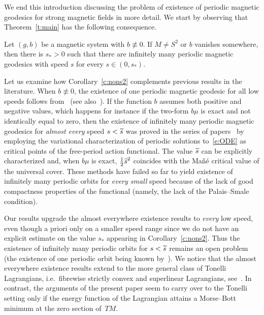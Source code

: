 \documentclass[AHL,Unicode,longabstracts,published]{cedram}
\let\oldtilde\tilde
\renewcommand*{\tilde}[1]{\mathchoice{\widetilde{#1}}{\widetilde{#1}}{\oldtilde{#1}}{\oldtilde{#1}}}
\begin{document}
We end this introduction discussing the problem of existence of periodic magnetic geodesics for strong magnetic fields in more detail. We start by observing that Theorem~\ref{t:main} has the following consequence.

\begin{coro}\label{c:nons2}
Let $(g,b)$ be a magnetic system with $b\not\equiv 0$. If $M\neq S^2$ or $b$ vanishes somewhere, then there is $s_*>0$ such that there are infinitely many periodic magnetic geodesics with speed $s$ for every $s\in (0,s_*)$.
\end{coro}

Let us examine how Corollary~\ref{c:nons2} complements previous results in the literature. When $b\not\equiv 0$, the existence of one periodic magnetic geodesic for all low speeds follows from~\cite{Ginzburg:1987lq} (see also~\cite{AB21}). If the function $b$ assumes both positive and negative values, which happens for instance if the two-form $b\mu$ is exact and not identically equal to zero, then the existence of infinitely many periodic magnetic geodesics for \emph{almost every} speed $s<\tilde s$ was proved in the series of papers~\cite{Abbondandolo:2017,Asselle:2015ij,Asselle:2015hc,Abbondandolo:2014rb,Abbondandolo:2015lt} by employing the variational characterization of periodic solutions to~\eqref{e:ODE} as critical points of the free-period action functional. The value $\tilde s$ can be explicitly characterized and, when $b\mu$ is exact, $\tfrac12{\tilde s}^2$ coincides with the Mañé critical value of the universal cover. These methods have failed so far to yield existence of infinitely many periodic orbits for \emph{every small} speed because of the lack of good compactness properties of the functional (namely, the lack of the Palais--Smale condition).

Our results upgrade the almost everywhere existence results to \emph{every} low speed, even though a priori only on a smaller speed range since we do not have an explicit estimate on the value $s_*$ appearing in Corollary~\ref{c:nons2}. Thus the existence of infinitely many periodic orbits for $s<\tilde s$ remains an open problem (the existence of one periodic orbit being known by~\cite{Contreras:2004lv,Taimanov:1992fs}). We notice that the almost everywhere existence results extend to the more general class of Tonelli Lagrangians, i.e.~fibrewise strictly convex and superlinear Lagrangians, see~\cite{Asselle:2016qv}. In contrast, the arguments of the present paper seem to carry over to the Tonelli setting only if the energy function of the Lagrangian attains a Morse--Bott minimum at the zero section of~$TM$.
\end{document}
